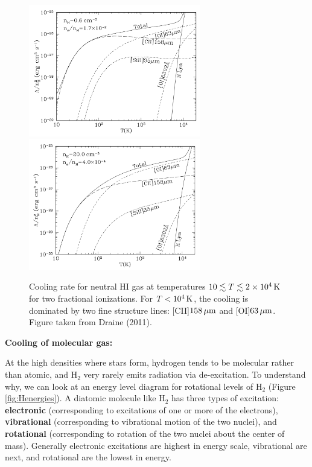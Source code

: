 \documentclass[a4paper,10pt]{article}
\begin{document}
\begin{figure}[h!]
    \centering
    \includegraphics[width=7.5cm]{figures/CoolingFunction_HI_top.png} \includegraphics[width=7.5cm]{figures/CoolingFunction_HI_bottom.png}
    \caption{\footnotesize{Cooling rate for neutral HI gas at temperatures $10\lesssim T\lesssim2\times10^4\,{\rm K}$ for two fractional ionizations. For $T<10^4\,{\rm K}$, the cooling is dominated by two fine structure lines: [CII]$158\,\mu{\rm m}$ and [OI]$63\,\mu{\rm m}$. Figure taken from Draine (2011).}}
    \label{fig:coolingfunction_HI}
\end{figure}

{\noindent}\textbf{Cooling of molecular gas:}

{\noindent}At the high densities where stars form, hydrogen tends to be molecular rather than atomic, and H$_2$ very rarely emits radiation via de-excitation. To understand why, we can look at an energy level diagram for rotational levels of H$_2$ (Figure \ref{fig:Henergies}). A diatomic molecule like H$_2$ has three types of excitation: \textbf{electronic} (corresponding to excitations of one or more of the electrons), \textbf{vibrational} (corresponding to vibrational motion of the two nuclei), and \textbf{rotational} (corresponding to rotation of the two nuclei about the center of mass). Generally electronic excitations are highest in energy scale, vibrational are next, and rotational are the lowest in energy.
\end{document}
